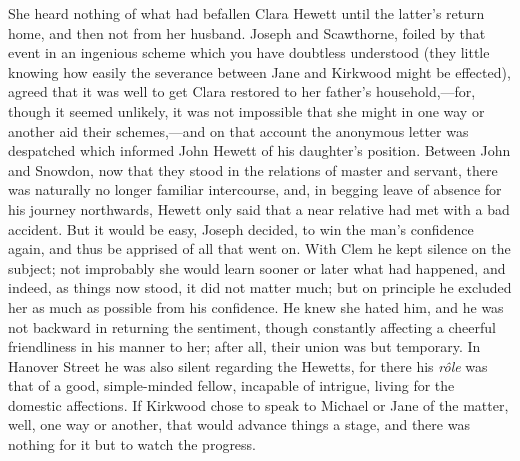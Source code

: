 She heard nothing of what had befallen Clara Hewett until the latter's
return home, and then not from her husband. Joseph and Scawthorne,
foiled by that event in an ingenious scheme which you have doubtless
understood (they little knowing how easily the severance between Jane
and Kirkwood might be effected), agreed that it was well to get Clara
restored to her father's household,---for, though it seemed unlikely, it
was not impossible that she might in one way or another aid their
schemes,---and on that account the anonymous letter was despatched which
informed John Hewett of his daughter's position. Between John and
Snowdon, now that they stood in the relations of master and servant,
there was naturally no longer familiar intercourse, and, in begging
leave of absence for his journey northwards, Hewett only said that a
near relative had met with a bad accident. But it would be easy, Joseph
decided, to win the man's confidence again, and thus be apprised of all
that went on. With Clem he {\protect\hypertarget{27}{}{}}kept silence on
the subject; not improbably she would learn sooner or later what had
happened, and indeed, as things now stood, it did not matter much; but
on principle he excluded her as much as possible from his confidence. He
knew she hated him, and he was not backward in returning the sentiment,
though constantly affecting a cheerful friendliness in his manner to
her; after all, their union was but temporary. In Hanover Street he was
also silent regarding the Hewetts, for there his \emph{rôle} was that of
a good, simple-minded fellow, incapable of intrigue, living for the
domestic affections. If Kirkwood chose to speak to Michael or Jane of
the matter, well, one way or another, that would advance things a stage,
and there was nothing for it but to watch the progress.


